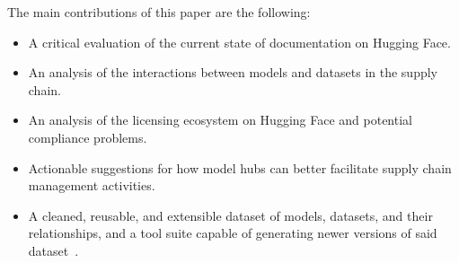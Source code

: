 The main contributions of this paper are the following:
\begin{itemize}
    \item A critical evaluation of the current state of documentation on Hugging Face.
    \item An analysis of the interactions between models and datasets in the supply chain.
    \item An analysis of the licensing ecosystem on Hugging Face and potential compliance problems.
    \item Actionable suggestions for how model hubs can better facilitate supply chain management activities.
    \item A cleaned, reusable, and extensible dataset of models, datasets, and their relationships, and a tool suite capable of generating newer versions of said dataset~\cite{anonymous_repo}.
\end{itemize}
